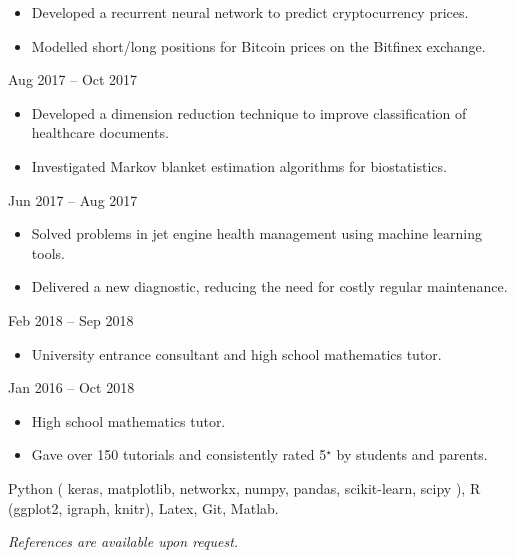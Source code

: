 \documentclass[
  date,
  number,
]{wgu-cv}
\begin{document}
\begin{itemize}
	\item Developed a recurrent neural network to predict cryptocurrency prices.
	\item Modelled short/long positions for Bitcoin prices on the Bitfinex exchange.
\end{itemize}


{}
{Aug 2017 -- Oct 2017}

\begin{itemize}
	\item Developed a dimension reduction technique to
    improve classification of healthcare documents.
	\item Investigated Markov blanket estimation algorithms for biostatistics.
\end{itemize}


{}
{Jun 2017 -- Aug 2017}

\begin{itemize}
	\item Solved problems in jet engine health management using machine learning tools.
	\item Delivered a new diagnostic, reducing the need for costly regular maintenance.
\end{itemize}



{}
{Feb 2018 -- Sep 2018}

\begin{itemize}
	\item University entrance consultant and high school mathematics tutor.
\end{itemize}


{}
{Jan 2016 -- Oct 2018}

\begin{itemize}
	\item High school mathematics tutor.
	\item Gave over 150 tutorials and consistently rated 5$^\star$ by students and parents.
\end{itemize}



Python (%
  keras,
  matplotlib,
  networkx,
  numpy,
  pandas,
  scikit-learn,
  scipy%
),
R (ggplot2, igraph, knitr),
Latex,
Git,
Matlab.



\emph{References are available upon request.}



\nobibliography*
\end{document}

